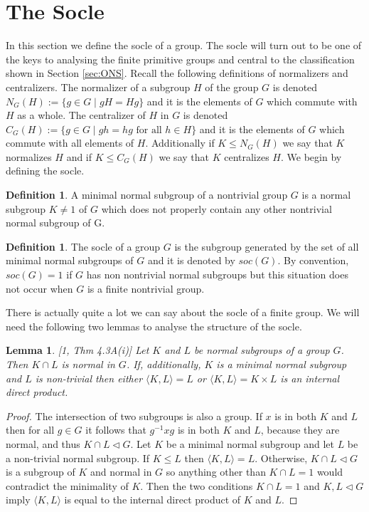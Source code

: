 \documentclass[]{article}
\newtheorem{lem}[thm]{Lemma}
\theoremstyle{definition}
\newtheorem{defn}[thm]{Definition}
\begin{document}
\section{The Socle}
In this section we define the socle of a group. The socle will turn out to be one of the keys to analysing the finite primitive groups and central to the classification shown in Section \ref{sec:ONS}. Recall the following definitions of normalizers and centralizers. The normalizer of a subgroup $H$ of the group $G$ is denoted $N_G(H):=\{g \in G \; | \; gH=Hg \}$ and it is the elements of $G$ which commute with $H$ as a whole. The centralizer of $H$ in $G$ is denoted $C_G(H):=\{g \in G \; | \; gh=hg \mbox{ for all } h \in H \}$ and it is the elements of $G$ which commute with all elements of $H$. Additionally if $K \leqslant N_G(H)$ we say that $K$ normalizes $H$ and if $K \leqslant C_G(H)$ we say that $K$ centralizes $H$. We begin by defining the socle.

\begin{defn} A minimal normal subgroup of a nontrivial group $G$ is a normal subgroup $K \neq 1$ of $G$ which does not properly contain any other nontrivial normal subgroup of G.
\end{defn}

\begin{defn}
The socle of a group $G$ is the subgroup generated by the set of all minimal normal subgroups of $G$ and it is denoted by $soc(G)$. By convention, $soc(G)=1$ if $G$ has non nontrivial normal subgroups but this situation does not occur when $G$ is a finite nontrivial group.
\end{defn}

There is actually quite a lot we can say about the socle of a finite group. We will need the following two lemmas to analyse the structure of the socle.

\begin{lem} \label{lem:minnor} \emph{[1, Thm 4.3A(i)]}
	Let $K$ and $L$ be normal subgroups of a group $G$. Then $K \cap L$ is normal in $G$. If, additionally, $K$ is a minimal normal subgroup and $L$ is non-trivial then either $\langle K,L \rangle = L$ or $\langle K,L \rangle = K \times L$ is an internal direct product.
\end{lem}

\begin{proof}
The intersection of two subgroups is also a group. If $x$ is in both $K$ and $L$ then for all $g \in G$ it follows that $g^{-1}xg$ is in both $K$ and $L$, because they are normal, and thus $K \cap L \vartriangleleft G$. Let $K$ be a minimal normal subgroup and let $L$ be a non-trivial normal subgroup. If $K \leqslant L$ then $\langle K,L \rangle = L$. Otherwise, $K \cap L \vartriangleleft G$ is a subgroup of $K$ and normal in $G$ so anything other than $K \cap L = 1$ would contradict the minimality of $K$. Then the two conditions $K \cap L = 1$ and $K,L \vartriangleleft G$ imply $\langle K, L \rangle$ is equal to the internal direct product of $K$ and $L$.
\end{proof}
\end{document}

